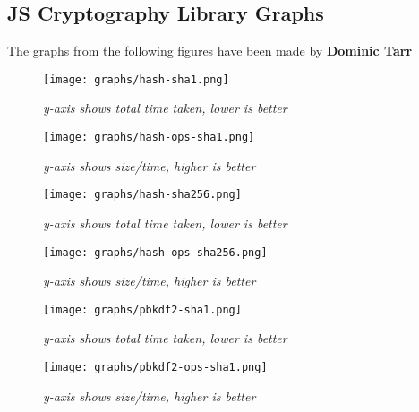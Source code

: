 
\subsection{JS Cryptography Library Graphs}
The graphs from the following figures have been made by \textbf{Dominic Tarr} \cite {Tarr2014PerformanceLibraries.}

\begin{figure}[!ht]
\centering
\texttt{[image: graphs/hash-sha1.png]}
\caption{\small \sl y-axis shows total time taken, lower is better
\label{fig:hash-sha1}}  
\end{figure}

\begin{figure}[!ht]
\centering
\texttt{[image: graphs/hash-ops-sha1.png]}
\caption{\small \sl y-axis shows size/time, higher is better
\label{fig:hash-ops-sha1}}
\end{figure}

\begin{figure}[!ht]
\centering
\texttt{[image: graphs/hash-sha256.png]}
\caption{\small \sl y-axis shows total time taken, lower is better
\label{fig:hash-sha256}}
\end{figure}

\begin{figure}[!ht]
\centering
\texttt{[image: graphs/hash-ops-sha256.png]}
\caption{\small \sl y-axis shows size/time, higher is better
\label{fig:hash-ops-sha256}}
\end{figure} 

\begin{figure}[!ht]
\centering
\texttt{[image: graphs/pbkdf2-sha1.png]}
\caption{\small \sl y-axis shows total time taken, lower is better
\label{fig:pbkdf2-sha1}}
\end{figure}

\begin{figure}[!ht]
\centering
\texttt{[image: graphs/pbkdf2-ops-sha1.png]}
\caption{\small \sl y-axis shows size/time, higher is better
\label{fig:pbkdf2-ops-sha1}}
\end{figure}

